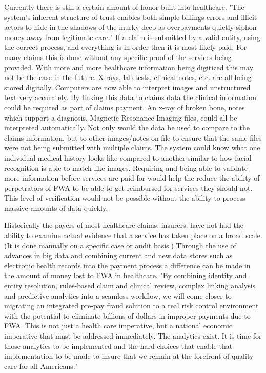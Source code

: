 \documentclass[sigconf]{acmart}
\begin{document}
Currently there is still a certain amount of honor built into healthcare.  "The system's 
inherent structure of trust enables both simple billings errors and illicit actors to hide 
in the shadows of the murky deep as overpayments quietly siphon money away from legitimate 
care."\cite{RevCycle}  If a claim is submitted by a valid entity, using the correct process, 
and everything is in order then it is most likely paid.  For many claims this is done 
without any specific proof of the services being provided.  With more and more healthcare 
information being digitized this may not be the case in the future.  X-rays, lab tests, 
clinical notes, etc. are all being stored digitally.  Computers are now able to interpret 
images and unstructured text very accurately.  By linking this data to claims data the clinical 
information could be required as part of claims payment.  An x-ray of broken bone, notes which 
support a diagnosis, Magnetic Resonance Imaging files, could all be interpreted automatically.  
Not only would the data be used to compare to the claims information, but to other images/notes 
on file to ensure that the same files were not being submitted with multiple claims.  The system 
could know what one individual medical history looks like compared to another similar to how 
facial recognition is able to match like images.  Requiring and being able to validate more 
information before services are paid for would help the reduce the ability of perpetrators of FWA 
to be able to get reimbursed for services they should not.  This level of verification would not 
be possible without the ability to process massive amounts of data quickly.  


Historically the payers of most healthcare claims, insurers, have not had the 
ability to examine actual evidence that a service has taken place on a broad scale.  (It is done 
manually on a specific case or audit basis.)  Through the use of advances in big data and combining 
current and new data stores such as electronic health records into the payment process a difference 
can be made in the amount of money lost to FWA in healthcare.  "By combining identity and entity resolution, 
rules-based claim and clinical review, complex linking analysis and predictive analytics into a 
seamless workflow, we will come closer to migrating an integrated pre-pay fraud solution to a real 
risk control environment with the potential to eliminate billions of dollars in improper payments due 
to FWA. This is not just a health care imperative, but a national economic imperative that must be 
addressed immediately. The analytics exist. It is time for those analytics to be implemented and the 
hard choices that enable that implementation to be made to insure that we remain at the forefront of 
quality care for all Americans."\cite{LexisNexis}
\end{document}
